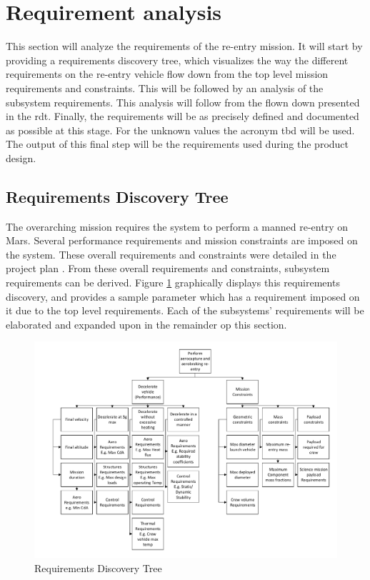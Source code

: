 \section{Requirement analysis} \label{ch:req}
This section will analyze the requirements of the re-entry mission. It will start by providing a requirements discovery tree, which visualizes the way the different requirements on the re-entry vehicle flow down from the top level mission requirements and constraints. This will be followed by an analysis of the subsystem requirements. This analysis will follow from the flown down presented in the \gls{rdt}. Finally, the requirements will be as precisely defined and documented as possible at this stage. For the unknown values the acronym \gls{tbd} will be used. The output of this final step will be the requirements used during the product design. %

\subsection{Requirements Discovery Tree}
The overarching mission requires the system to perform a manned re-entry on Mars. Several performance requirements and mission constraints are imposed on the system. These overall requirements and constraints were detailed in the project plan \cite{Balasooriyan2015}. From these overall requirements and constraints, subsystem requirements can be derived. Figure \ref{fig:RBS} graphically displays this requirements discovery, and provides a sample parameter which has a requirement imposed on it due to the top level requirements. Each of the subsystems' requirements will be elaborated and expanded upon in the remainder op this section. 


\vspace{-7mm}
\begin{figure}[H]
\centering
\includegraphics[width=1.00\textwidth]{Figure/RBS.pdf}
\vspace{-7mm}
\caption{Requirements Discovery Tree} 
\label{fig:RBS}
\end{figure}

